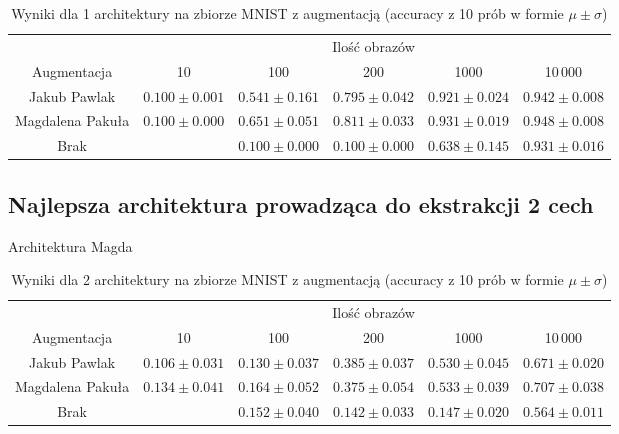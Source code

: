 \documentclass[10pt]{article}
\begin{document}
\begin{table}[H]\centering
    \begin{tabular}{cccccc}
        \toprule
                         & \multicolumn{5}{c}{Ilość obrazów}                                                                                   \\ \cmidrule{2-6}
        Augmentacja      & 10                                & 100               & 200                & 1000              & 10\,000            \\ \midrule
        Jakub Pawlak     & $0.100 \pm 0.001 $                & $0.541 \pm 0.161$ & $0.795 \pm 0.042 $ & $0.921 \pm 0.024$ & $0.942 \pm 0.008 $ \\
        Magdalena Pakuła & $0.100 \pm 0.000 $                & $0.651 \pm 0.051$ & $0.811 \pm 0.033$ & $0.931 \pm 0.019$ & $0.948 \pm 0.008$ \\
        Brak             &                                 & $0.100 \pm 0.000$ & $0.100 \pm 0.000$  & $0.638 \pm 0.145$ & $0.931 \pm 0.016$  \\
        \bottomrule
    \end{tabular}
    \caption{Wyniki dla 1 architektury na zbiorze MNIST z augmentacją (accuracy z 10 prób w formie $\mu \pm \sigma$)}
\end{table}

\subsection*{Najlepsza architektura prowadząca do ekstrakcji 2 cech}

Architektura Magda

\begin{table}[H]\centering
    \begin{tabular}{cccccc}
        \toprule
                         & \multicolumn{5}{c}{Ilość obrazów}                                                                                   \\ \cmidrule{2-6}
        Augmentacja      & 10                                & 100                & 200                & 1000              & 10\,000           \\ \midrule
        Jakub Pawlak     & $0.106 \pm 0.031 $                & $0.130 \pm 0.037 $ & $0.385 \pm 0.037 $ & $0.530 \pm 0.045$ & $0.671 \pm 0.020$ \\
        Magdalena Pakuła & $0.134 \pm 0.041 $                & $0.164 \pm 0.052$  & $0.375 \pm 0.054 $ & $0.533 \pm 0.039$ & $0.707 \pm 0.038$                     \\
        Brak             &                                 & $0.152 \pm 0.040$  & $0.142 \pm 0.033$  & $0.147 \pm 0.020$ & $0.564 \pm 0.011$ \\
        \bottomrule
    \end{tabular}
    \caption{Wyniki dla 2 architektury na zbiorze MNIST z augmentacją (accuracy z 10 prób w formie $\mu \pm \sigma$)}
    \label{tab:Wyniki_small_MNIST_tabela}
\end{table}
\end{document}
